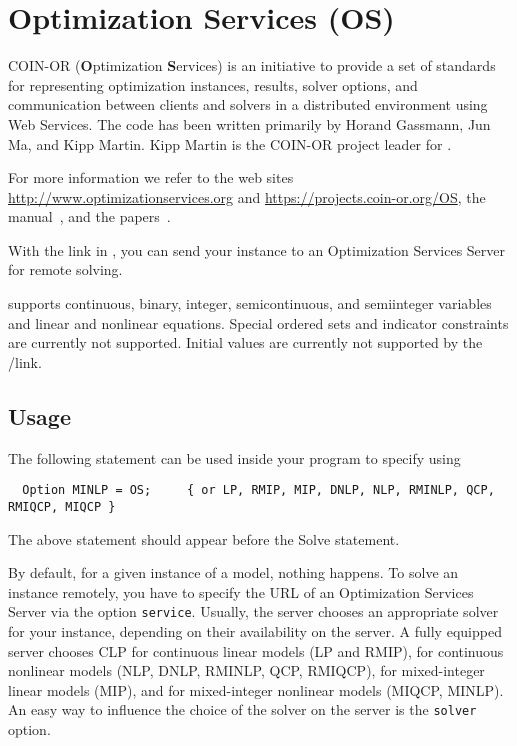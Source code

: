 \chapter{Optimization Services (OS)}

COIN-OR \OS (\textbf{O}ptimization \textbf{S}ervices) is an initiative to provide a set of standards for representing optimization instances, results, solver options, and communication between clients and solvers in a distributed environment using Web Services.
The code has been written primarily by Horand Gassmann, Jun Ma, and Kipp Martin.
Kipp Martin is the COIN-OR project leader for \OS.

For more information we refer to the web sites \url{http://www.optimizationservices.org} and \url{https://projects.coin-or.org/OS}, the \OS manual~\cite{Ma2005}, and the papers~\cite{FourerMaMartin2009,FourerMaMartin2010,OSManual}.

With the \OS link in \GAMS, you can send your instance to an Optimization Services Server for remote solving.

\OS supports continuous, binary, integer, semicontinuous, and semiinteger variables and linear and nonlinear equations.
Special ordered sets and indicator constraints are currently not supported.
Initial values are currently not supported by the \GAMS/\OS link.

\section{Usage}

The following statement can be used inside your \GAMS program to specify using \OS
\begin{verbatim}
  Option MINLP = OS;     { or LP, RMIP, MIP, DNLP, NLP, RMINLP, QCP, RMIQCP, MIQCP }
\end{verbatim}

The above statement should appear before the Solve statement.

By default, for a given instance of a \GAMS model, nothing happens.
To solve an instance remotely, you have to specify the URL of an Optimization Services Server via the option \texttt{service}.
Usually, the server chooses an appropriate solver for your instance, depending on their availability on the server.
A fully equipped server chooses
\textsc{CLP} for continuous linear models (LP and RMIP),
\IPOPT for continuous nonlinear models (NLP, DNLP, RMINLP, QCP, RMIQCP),
\CBC for mixed-integer linear models (MIP), and
\BONMIN for mixed-integer nonlinear models (MIQCP, MINLP).
An easy way to influence the choice of the solver on the server is the \texttt{solver} option.

